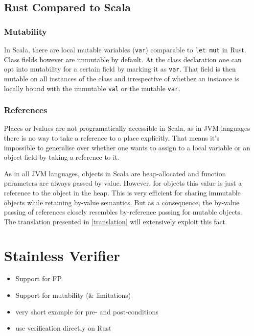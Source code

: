 \subsection{Rust Compared to Scala}

\subsubsection{Mutability}

In Scala, there are local mutable variables (\passthrough{\lstinline!var!})
comparable to \passthrough{\lstinline!let mut!} in Rust. Class fields however
are immutable by default. At the class declaration one can opt into mutability
for a certain field by marking it as \lstinline!var!. That field is then mutable
on all instances of the class and irrespective of whether an instance is locally
bound with the immutable \lstinline!val! or the mutable \lstinline!var!.

\subsubsection{References}

Places or lvalues are not programatically accessible in Scala, as in JVM
languages there is no way to take a reference to a place explicitly. That means
it's impossible to generalise over whether one wants to assign to a local
variable or an object field by taking a reference to it.

As in all JVM languages, objects in Scala are heap-allocated and function
parameters are always passed by value. However, for objects this value is just a
reference to the object in the heap. This is very efficient for sharing
immutable objects while retaining by-value semantics. But as a consequence, the
by-value passing of references closely resembles by-reference passing for
mutable objects. The translation presented in \autoref{translation} will
extensively exploit this fact.


\section{Stainless Verifier}

\begin{itemize}
  \item Support for FP
  \item Support for mutability (\& limitations)

  \item very short example for pre- and post-conditions
  \item use verification directly on Rust
\end{itemize}


